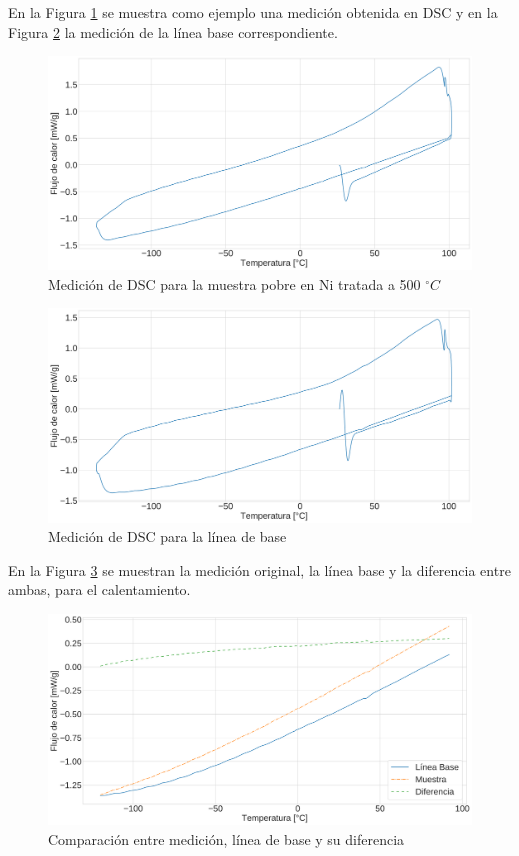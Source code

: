 \documentclass[12pt]{article}
\theoremstyle{definition}
\theoremstyle{remark}
\begin{document}
En la Figura \ref{MeasureExample} se muestra como ejemplo una medición obtenida en DSC y en la Figura \ref{BaseLine} la medición de la línea base correspondiente.

\begin{figure}[H]
	\centering	
	\includegraphics[scale=0.1]{img/500NiPoorExample}
	\caption{Medición de DSC para la muestra pobre en Ni tratada a 500 $^\circ C$}
	\label{MeasureExample}
\end{figure}

\begin{figure}[H]
	\centering
	\includegraphics[scale=0.1]{img/BaseLine}
	\caption{Medición de DSC para la línea de base}
	\label{BaseLine}
\end{figure}

En la Figura \ref{Comparison} se muestran la medición original, la línea base y la diferencia entre ambas, para el calentamiento.

\begin{figure}[H]
	\centering
	\includegraphics[scale=0.2]{img/NiPoorHeatingExample}
	\caption{Comparación entre medición, línea de base y su diferencia}
	\label{Comparison}
\end{figure}
\end{document}
